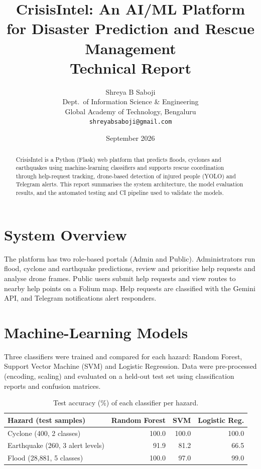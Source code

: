 \documentclass[11pt,a4paper]{article}
\title{\textbf{CrisisIntel: An AI/ML Platform\\for Disaster Prediction and Rescue Management}\\[4pt]\large Technical Report}
\author{Shreya B Saboji\\Dept.\ of Information Science \& Engineering\\Global Academy of Technology, Bengaluru\\\texttt{shreyabsaboji@gmail.com}}
\date{September 2026}
\begin{document}
\maketitle

\begin{abstract}
CrisisIntel is a Python (Flask) web platform that predicts floods, cyclones and earthquakes using machine-learning classifiers and supports rescue coordination through help-request tracking, drone-based detection of injured people (YOLO) and Telegram alerts. This report summarises the system architecture, the model evaluation results, and the automated testing and CI pipeline used to validate the models.
\end{abstract}

\section{System Overview}
The platform has two role-based portals (Admin and Public). Administrators run flood, cyclone and earthquake predictions, review and prioritise help requests and analyse drone frames. Public users submit help requests and view routes to nearby help points on a Folium map. Help requests are classified with the Gemini API, and Telegram notifications alert responders.

\section{Machine-Learning Models}
Three classifiers were trained and compared for each hazard: Random Forest, Support Vector Machine (SVM) and Logistic Regression. Data were pre-processed (encoding, scaling) and evaluated on a held-out test set using classification reports and confusion matrices.

\begin{table}[H]
\centering
\caption{Test accuracy (\%) of each classifier per hazard.}
\begin{tabular}{lrrr}
\toprule
\textbf{Hazard (test samples)} & \textbf{Random Forest} & \textbf{SVM} & \textbf{Logistic Reg.}\\
\midrule
Cyclone (400, 2 classes)        & 100.0 & 100.0 & 100.0\\
Earthquake (260, 3 alert levels)& 91.9  & 81.2  & 66.5\\
Flood (28{,}881, 5 classes)     & 100.0 & 97.0  & 99.0\\
\bottomrule
\end{tabular}
\end{table}
\end{document}

